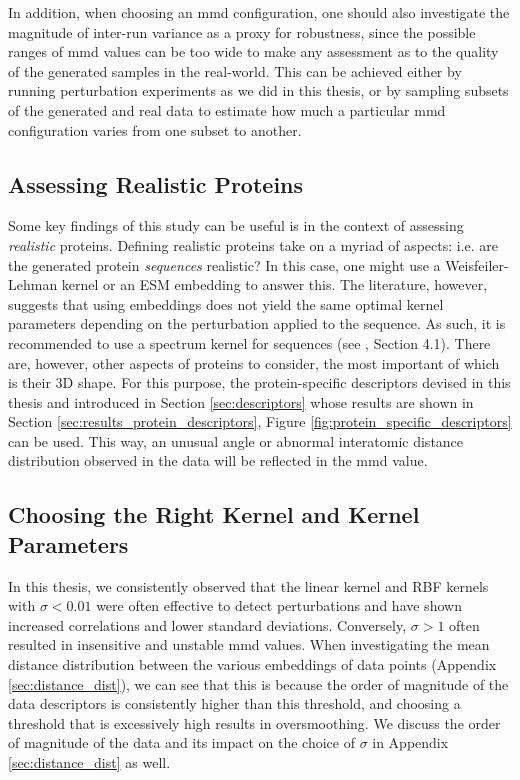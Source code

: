 In addition, when choosing an \gls{mmd} configuration, one should also
investigate the magnitude of inter-run variance as a proxy for robustness, since
the possible ranges of \gls{mmd} values can be too wide to make any
assessment as to the quality of the generated samples in the real-world. This
can be achieved either by running perturbation experiments as we did in this
thesis, or by sampling subsets of the generated and real data to estimate how
much a particular \gls{mmd} configuration varies from one subset to another.

\subsection{Assessing Realistic Proteins}\label{sec:discussion_realistic_proteins}

Some key findings of this study can be useful is in the context of assessing
\emph{realistic} proteins. Defining realistic proteins take on a myriad of
aspects: i.e. are the generated protein \emph{sequences} realistic? In this
case, one might use a Weisfeiler-Lehman kernel or an ESM embedding to answer
this. The literature, however, suggests that using embeddings does not yield the
same optimal kernel parameters depending on the perturbation applied to the
sequence. As such, it is recommended to use a spectrum kernel
\citep{leslie2002spectrum} for sequences (see \cite{kucera2022conditional},
Section 4.1). There are, however, other aspects of proteins to consider, the
most important of which is their 3D shape. For this purpose, the
protein-specific descriptors devised in this thesis and introduced in Section
\ref{sec:descriptors} whose results are shown in Section
\ref{sec:results_protein_descriptors}, Figure
\ref{fig:protein_specific_descriptors} can be used. This way, an unusual angle
or abnormal interatomic distance distribution observed in the data will be
reflected in the \gls{mmd} value.


\subsection{Choosing the Right Kernel and Kernel Parameters}
In this thesis, we consistently observed that the linear kernel and RBF kernels
with $\sigma<0.01$ were often effective to detect perturbations and have shown
increased correlations and lower standard deviations. Conversely, $\sigma>1$
often resulted in insensitive and unstable \gls{mmd} values. When
investigating the mean distance distribution between the various embeddings of
data points (Appendix \ref{sec:distance_dist}), we can see that this is because
the order of magnitude of the data descriptors is consistently higher than this
threshold, and choosing a threshold that is excessively high results in
oversmoothing. We discuss the order of magnitude of the data and its impact on
the choice of $\sigma$ in Appendix \ref{sec:distance_dist} as well.

